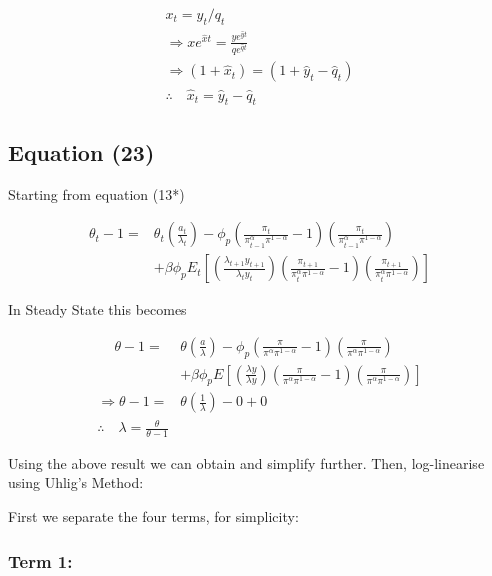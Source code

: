 \documentclass[11pt,preprint, authoryear]{elsarticle}
\numberwithin{equation}{section}
\numberwithin{figure}{section}
\numberwithin{table}{section}
\begin{document}
\[\begin{aligned} x_{t}=y_{t} / q_t\\
\Rightarrow x e^{\hat{x} t}=\frac{y e^{\hat{y} t}}{q e^{\hat{q} t}}\\
\Rightarrow\left(1+\hat{x}_{t}\right)=\left(1+\hat{y}_{t}-\hat{q}_{t}\right)\\
\therefore \quad \hat{x}_{t}=\hat{y}_{t}-\hat{q}_{t} \end{aligned}\]

\hypertarget{equation-23}{%
\subsection{Equation (23)}\label{equation-23}}

Starting from equation (13*)

\[\begin{aligned} \theta_{t}-1=& \theta_{t}\left(\frac{a_{t}}{\lambda_{t}}\right)-\phi_{p}\left(\frac{\pi_{t}}{\pi_{t-1}^{\alpha} \pi^{1-\alpha}}-1\right)\left(\frac{\pi_{t}}{\pi_{t-1}^{\alpha} \pi^{1-\alpha}}\right) \\
&+\beta \phi_{p} E_{t}\left[\left(\frac{\lambda_{t+1} y_{t+1}}{\lambda_{t} y_{t}}\right)\left(\frac{\pi_{t+1}}{\pi_{t}^{\alpha} \pi^{1-\alpha}}-1\right)\left(\frac{\pi_{t+1}}{\pi_{t}^{\alpha} \pi^{1-\alpha}}\right)\right]
\end{aligned}\]

In Steady State this becomes

\[\begin{aligned}
\quad \ \theta-1=& \theta\left(\frac{a}{\lambda}\right)-\phi_{p}\left(\frac{\pi}{\pi^{\alpha} \pi^{1-\alpha}}-1\right)\left(\frac{\pi}{\pi^{\alpha} \pi^{1-\alpha}}\right) \\
&+\beta \phi_{p} E\left[\left(\frac{\lambda y}{\lambda y}\right)\left(\frac{\pi}{\pi^{\alpha} \pi^{1-\alpha}}-1\right)\left(\frac{\pi}{\pi^{\alpha} \pi^{1-\alpha}}\right)\right]\\
\Rightarrow \theta-1=& \theta\left(\frac{1}{\lambda}\right)-0 + 0 \\
\therefore \quad \lambda = \frac{\theta}{\theta-1}
\end{aligned}\]

Using the above result we can obtain and simplify further. Then,
log-linearise using Uhlig's Method:

First we separate the four terms, for simplicity:

\hypertarget{term-1}{%
\subsubsection{Term 1:}\label{term-1}}
\end{document}
